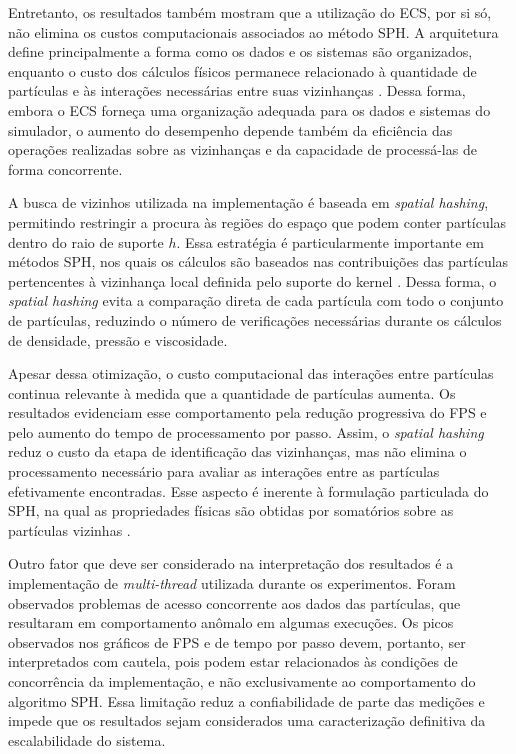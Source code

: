 Entretanto, os resultados também mostram que a utilização do ECS, por si só,
não elimina os custos computacionais associados ao método SPH. A arquitetura
define principalmente a forma como os dados e os sistemas são organizados,
enquanto o custo dos cálculos físicos permanece relacionado à quantidade de
partículas e às interações necessárias entre suas vizinhanças
\cite{bilas2002,monaghan2005}. Dessa forma, embora o ECS forneça uma
organização adequada para os dados e sistemas do simulador, o aumento do
desempenho depende também da eficiência das operações realizadas sobre as
vizinhanças e da capacidade de processá-las de forma concorrente.

A busca de vizinhos utilizada na implementação é baseada em \textit{spatial
hashing}, permitindo restringir a procura às regiões do espaço que podem conter
partículas dentro do raio de suporte $h$. Essa estratégia é particularmente
importante em métodos SPH, nos quais os cálculos são baseados nas contribuições
das partículas pertencentes à vizinhança local definida pelo suporte do kernel
\cite{monaghan2005,koschier2020sph}. Dessa forma, o \textit{spatial hashing}
evita a comparação direta de cada partícula com todo o conjunto de partículas,
reduzindo o número de verificações necessárias durante os cálculos de
densidade, pressão e viscosidade.

Apesar dessa otimização, o custo computacional das interações entre partículas
continua relevante à medida que a quantidade de partículas aumenta. Os
resultados evidenciam esse comportamento pela redução progressiva do FPS e pelo
aumento do tempo de processamento por passo. Assim, o \textit{spatial hashing}
reduz o custo da etapa de identificação das vizinhanças, mas não elimina o
processamento necessário para avaliar as interações entre as partículas
efetivamente encontradas. Esse aspecto é inerente à formulação particulada do
SPH, na qual as propriedades físicas são obtidas por somatórios sobre as
partículas vizinhas \cite{monaghan2005}.

Outro fator que deve ser considerado na interpretação dos resultados é a
implementação de \textit{multi-thread} utilizada durante os experimentos. Foram
observados problemas de acesso concorrente aos dados das partículas, que
resultaram em comportamento anômalo em algumas execuções. Os picos observados
nos gráficos de FPS e de tempo por passo devem, portanto, ser interpretados com
cautela, pois podem estar relacionados às condições de concorrência da
implementação, e não exclusivamente ao comportamento do algoritmo SPH. Essa
limitação reduz a confiabilidade de parte das medições e impede que os
resultados sejam considerados uma caracterização definitiva da escalabilidade
do sistema.

